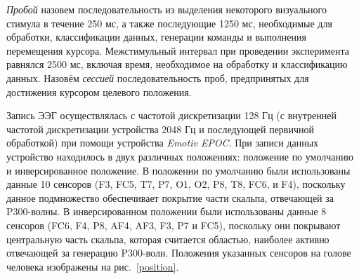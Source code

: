 \documentclass[12pt,a4paper,oneside,fleqn,leqno]{article}
\begin{document}
	\par {\it Пробой} назовем последовательность из выделения некоторого визуального стимула в течение 250 мс, а также последующие 1250 мс, необходимые для обработки, классификации данных, генерации команды и выполнения перемещения курсора. Межстимульный интервал при проведении эксперимента равнялся 2500 мс, включая время, необходимое на обработку и классификацию данных. Назовём {\it сессией} последовательность проб, предпринятых для достижения курсором целевого положения.
	\par Запись ЭЭГ осуществлялась с частотой дискретизации 128 Гц (с внутренней частотой дискретизации устройства 2048 Гц и последующей первичной обработкой) при помощи устройства {\it Emotiv EPOC}. При записи данных устройство находилось в двух различных положениях: положение по умолчанию и инверсированное положение. В положении по умолчанию были использованы данные 10 сенсоров (F3, FC5, T7, P7, O1, O2, P8, T8, FC6, и F4), поскольку данное подмножество обеспечивает покрытие части скальпа, отвечающей за P300-волны. В инверсированном положении были использованы данные 8 сенсоров (FC6, F4, P8, AF4, AF3, F3, P7 и FC5), поскольку они покрывают центральную часть скальпа, которая считается областью, наиболее активно отвечающей за генерацию P300-волн. Положения указанных сенсоров на голове человека изображены на рис.~\ref{position}.
\end{document}
